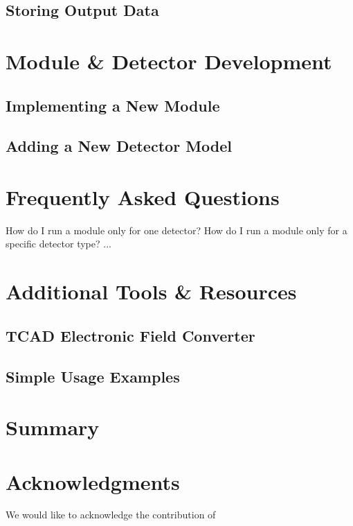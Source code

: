 \documentclass{scrartcl}
\begin{document}
\subsection{Storing Output Data}

\section{Module \& Detector Development}
\subsection{Implementing a New Module}
\subsection{Adding a New Detector Model}

\section{Frequently Asked Questions}
How do I run a module only for one detector?
How do I run a module only for a specific detector type?
...

\section{Additional Tools \& Resources}
\subsection{TCAD Electronic Field Converter}
\subsection{Simple Usage Examples}

\section{Summary}

\section{Acknowledgments}
We would like to acknowledge the contribution of

\appendix
\clearpage


\clearpage
{}
{}
\begin{thebibliography}{99}
  
\end{thebibliography}
\end{document}
